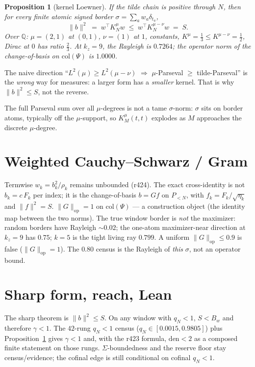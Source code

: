 \documentclass[11pt]{article}
\newtheorem{prop}{Proposition}
\theoremstyle{remark}
\begin{document}
\begin{prop}[kernel Loewner]\label{prop:kernel}
If the tilde chain is positive through $N$,
then for every finite atomic signed border
$\sigma=\sum_a w_a\delta_{t_a}$,
\[
  \|b\|^2
  \;=\;
  w^\top K_N^\mu w
  \;\le\;
  w^\top K_N^{\mu-\nu} w
  \;=\;
  S.
\]
Over $\mathbb{Q}$: $\mu=(2,1)$ at $(0,1)$,
$\nu=(1)$ at $1$, constants,
$K^\mu=\tfrac13\le K^{\mu-\nu}=\tfrac12$,
Dirac at $0$ has ratio $\tfrac23$.
At $k_z=9$, the Rayleigh is $0.7264$;
the operator norm of the change-of-basis on
$\mathrm{col}(\Psi)$ is $1.0000$.
\end{prop}

The naive direction
``$L^2(\mu)\ge L^2(\mu-\nu)$ $\Rightarrow$
$\mu$-Parseval $\ge$ tilde-Parseval''
is the \emph{wrong} way for measures:
a larger form has a \emph{smaller} kernel.
That is why $\|b\|^2\le S$, not the reverse.

The full Parseval sum over all $\mu$-degrees
is not a tame $\sigma$-norm:
$\sigma$ sits on border atoms, typically off
the $\mu$-support, so $K_M^\mu(t,t)$ explodes
as $M$ approaches the discrete $\mu$-degree.

\section{Weighted Cauchy--Schwarz / Gram}\label{sec:gram}

Termwise $w_k=b_k^2/\rho_k$ remains unbounded
(r424).
The exact cross-identity is not
$b_k=c\,F_k$ per index; it is the
change-of-basis $b=Gf$ on $P_{<N}$,
with $f_k=F_k/\sqrt{\eta_k}$ and $\|f\|^2=S$.
$\|G\|_{\mathrm{op}}=1$ on $\mathrm{col}(\Psi)$
--- a construction object (the identity map
between the two norms).
The true window border is \emph{not} the
maximizer: random borders have Rayleigh
$\sim 0.02$; the one-atom maximizer-near
direction at $k_z=9$ has $0.75$;
$k=5$ is the tight living ray $0.799$.
A uniform $\|G\|_{\mathrm{op}}\le 0.9$ is
false ($\|G\|_{\mathrm{op}}=1$).
The $0.80$ census is the Rayleigh of
\emph{this} $\sigma$, not an operator bound.

\section{Sharp form, reach, Lean}\label{sec:reach}

The sharp theorem is $\|b\|^2\le S$.
On any window with $q_N<1$,
$S<B_w$ and therefore $\gamma<1$.
The $42$-rung $q_N<1$ census
($q_N\in[0.0015,0.9805]$) plus
Proposition~\ref{prop:kernel} gives
$\gamma<1$ and, with the r423 formula,
$\mathrm{den}<2$ as a composed finite
statement on those rungs.
$\Sigma$-boundedness and the reserve floor
stay census/evidence; the cofinal edge
is still conditional on cofinal $q_N<1$.
\end{document}
